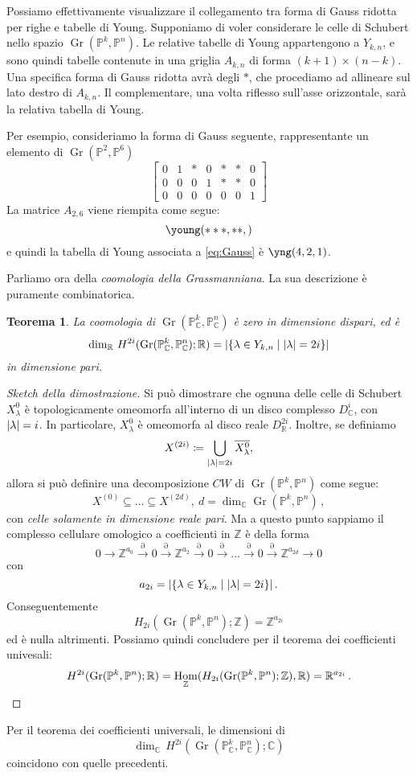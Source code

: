 \documentclass[a4paper, 11pt]{article}
\theoremstyle{definition}
\theoremstyle{plain}
\newtheorem{Teo}[Def]{Teorema}
\DeclarePairedDelimiter{\abs}{\lvert}{\rvert}
\newcommand{\PP}{\mathbb{P}}
\newcommand{\R}{\mathbb{R}}
\newcommand{\C}{\mathbb{C}}
\newcommand{\Z}{\mathbb{Z}}
\newcommand{\deff}{\coloneqq}
\DeclareMathOperator{\Hom}{Hom}
\DeclareMathOperator{\Gr}{Gr}
\begin{document}
Possiamo effettivamente visualizzare il collegamento tra forma di Gauss ridotta per righe e tabelle di Young. Supponiamo di voler considerare le celle di Schubert nello spazio $\Gr(\PP^k, \PP^n)$. Le relative tabelle di Young appartengono a $Y_{k,n}$, e sono quindi tabelle contenute in una griglia $A_{k,n}$ di forma $(k+1)\times (n-k)$. Una specifica forma di Gauss ridotta avrà degli $*$, che procediamo ad allineare sul lato destro di $A_{k,n}$. Il complementare, una volta riflesso sull'asse orizzontale, sarà la relativa tabella di Young. 

Per esempio, consideriamo la forma di Gauss seguente, rappresentante un elemento di $\Gr(\PP^2, \PP^6)$
\begin{equation}\label{eq:Gauss}
	\begin{bmatrix}
		0 & 1 & * & 0 & * & * & 0 \\
		0 & 0 & 0 & 1 & * & * & 0 \\
		0 & 0 & 0 & 0 & 0 & 0 & 1
	\end{bmatrix}	
\end{equation}
La matrice $A_{2,6}$ viene riempita come segue:
\[
	\young(\hfil ***,\hfil\hfil **,\hfil\hfil\hfil\hfil)
\]
e quindi la tabella di Young associata a \eqref{eq:Gauss} è {\tiny$ \yng(4,2,1)$.\vspace{1ex}}

Parliamo ora della \emph{coomologia della Grassmanniana}. La sua descrizione è puramente combinatorica.
\begin{Teo}
	La coomologia di $\Gr(\PP^k_\C, \PP^n_\C)$ è zero in dimensione dispari, ed è
	\[
		\dim_\R\,H^{2i}(\Gr(\PP^k_\C, \PP^n_\C); \R) = \abs{\{\lambda \in Y_{k,n}\mid \abs{\lambda} = 2i\}}
	\]
	in dimensione pari.
\end{Teo}
\begin{proof}[Sketch della dimostrazione]
	Si può dimostrare che ognuna delle celle di Schubert $X^0_\lambda$ è topologicamente omeomorfa all'interno di un disco complesso $D_\C^i$, con $\abs{\lambda} = i$. In particolare, $X^0_\lambda$ è omeomorfa al disco reale $D_\R^{2i}$. Inoltre, se definiamo
	\[
		X^{(2i)} \deff \bigcup_{\abs{\lambda} = 2i} \overline{X^0_\lambda},
	\]
	allora si può definire una decomposizione $CW$ di $\Gr(\PP^k, \PP^n)$ come segue:
	\[	
		X^{(0)} \subseteq \dots \subseteq X^{(2d)},\ d = \dim_\C \Gr(\PP^k, \PP^n)\,,
	\]
	con \emph{celle solamente in dimensione reale pari}. Ma a questo punto sappiamo il complesso cellulare omologico a coefficienti in $\Z$ è della forma
	\[
		0 \to \Z^{a_0} \overset{\partial}{\to} 0 \overset{\partial}{\to} \Z^{a_2} \overset{\partial}{\to} 0 \overset{\partial}{\to} \dots \overset{\partial}{\to} 0 \overset{\partial}{\to} \Z^{a_{2d}} \to 0 
	\]
	con 
	\[
		a_{2i} = \abs{\{\lambda \in Y_{k,n} \mid \abs{\lambda} = 2i\}}\,.
	\]
	Conseguentemente 
	\[
		H_{2i}(\Gr(\PP^k, \PP^n);\Z) = \Z^{a_{2i}}
	\]
	ed è nulla altrimenti. Possiamo quindi concludere per il teorema dei coefficienti univesali:
	\[
		H^{2i}(\Gr(\PP^k, \PP^n); \R) = \Hom_\Z(H_{2i}(\Gr(\PP^k, \PP^n);\Z),\R) = \R^{a_{2i}}\,. \qedhere
	\]
\end{proof}
Per il teorema dei coefficienti universali, le dimensioni di 
\[
	\dim_\C\,H^{2i}(\Gr(\PP^k_\C, \PP^n_\C); \C)
\]
coincidono con quelle precedenti.
\end{document}
